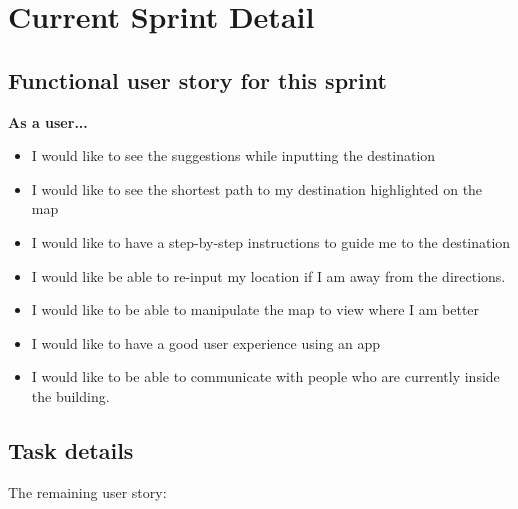 \documentclass[12pt]{article}
\begin{document}
\section{Current Sprint Detail}

\subsection{Functional user story for this sprint}


\textbf{As a user...}
\begin{itemize}

\item I would like to see the suggestions while inputting the destination
\item I would like to see the shortest path to my destination highlighted on the map
\item I would like to have a step-by-step instructions to guide me to the destination
\item I would like be able to re-input my location if I am away from the directions.
\item I would like to be able to manipulate the map to view where I am better
\item I would like to have a good user experience using an app
\item I would like to be able to communicate with people who are currently inside the building.

\end{itemize}


\subsection{Task details}


%

The remaining user story:


\end{document}

